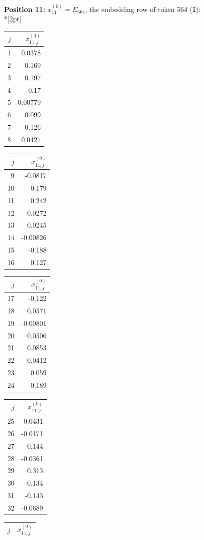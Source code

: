 \noindent \textbf{Position 11:} $x^{(0)}_{11} = E_{564}$, the embedding row of token 564 (\texttt{I}):\\*[2pt]
{\tablefont \begin{tabular}[t]{r|r}
$j$ & $x^{(0)}_{11,j}$ \\\hline
1 & 0.0378 \\
2 & 0.169 \\
3 & 0.197 \\
4 & -0.17 \\
5 & 0.00779 \\
6 & 0.099 \\
7 & 0.126 \\
8 & 0.0427
\end{tabular}\kern4pt
\begin{tabular}[t]{r|r}
$j$ & $x^{(0)}_{11,j}$ \\\hline
9 & -0.0817 \\
10 & -0.179 \\
11 & 0.242 \\
12 & 0.0272 \\
13 & 0.0245 \\
14 & -0.00826 \\
15 & -0.188 \\
16 & 0.127
\end{tabular}\kern4pt
\begin{tabular}[t]{r|r}
$j$ & $x^{(0)}_{11,j}$ \\\hline
17 & -0.122 \\
18 & 0.0571 \\
19 & -0.00801 \\
20 & 0.0506 \\
21 & 0.0853 \\
22 & 0.0412 \\
23 & 0.059 \\
24 & -0.189
\end{tabular}\kern4pt
\begin{tabular}[t]{r|r}
$j$ & $x^{(0)}_{11,j}$ \\\hline
25 & 0.0431 \\
26 & -0.0171 \\
27 & -0.144 \\
28 & -0.0361 \\
29 & 0.313 \\
30 & 0.134 \\
31 & -0.143 \\
32 & -0.0689
\end{tabular}\kern4pt
\begin{tabular}[t]{r|r}
$j$ & $x^{(0)}_{11,j}$ \\\hline

\end{tabular}}
